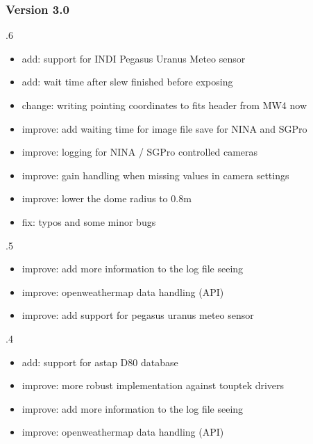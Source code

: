 \documentclass[a4paper,10pt,english]{sphinxmanual}
\begin{document}
\subsubsection{Version 3.0}
\label{\detokenize{changelog/changelog:version-3-0}}
.6
\begin{itemize}
\item {} 
\sphinxAtStartPar
add: support for INDI Pegasus Uranus Meteo sensor

\item {} 
\sphinxAtStartPar
add: wait time after slew finished before exposing

\item {} 
\sphinxAtStartPar
change: writing pointing coordinates to fits header from MW4 now

\item {} 
\sphinxAtStartPar
improve: add waiting time for image file save for NINA and SGPro

\item {} 
\sphinxAtStartPar
improve: logging for NINA / SGPro controlled cameras

\item {} 
\sphinxAtStartPar
improve: gain handling when missing values in camera settings

\item {} 
\sphinxAtStartPar
improve: lower the dome radius to 0.8m

\item {} 
\sphinxAtStartPar
fix: typos and some minor bugs

\end{itemize}

.5
\begin{itemize}
\item {} 
\sphinxAtStartPar
improve: add more information to the log file seeing

\item {} 
\sphinxAtStartPar
improve: openweathermap data handling (API)

\item {} 
\sphinxAtStartPar
improve: add support for pegasus uranus meteo sensor

\end{itemize}

.4
\begin{itemize}
\item {} 
\sphinxAtStartPar
add: support for astap D80 database

\item {} 
\sphinxAtStartPar
improve: more robust implementation against touptek drivers

\item {} 
\sphinxAtStartPar
improve: add more information to the log file seeing

\item {} 
\sphinxAtStartPar
improve: openweathermap data handling (API)

\end{itemize}
\end{document}
